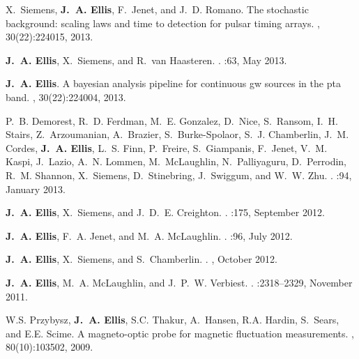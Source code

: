 \documentclass[11pt,letterpaper,sans]{moderncv} %
\begin{document}
\begin{thebibliography}{10}
X.~{Siemens}, \textbf{J.~A. {Ellis}}, F.~{Jenet}, and J.~D. {Romano}.
\newblock The stochastic background: scaling laws and time to detection for
  pulsar timing arrays.
, 30(22):224015, 2013.

\textbf{J.~A. {Ellis}}, X.~{Siemens}, and R.~{van Haasteren}.
.
:63, May 2013.

\textbf{J.~A. {Ellis}}.
\newblock A bayesian analysis pipeline for continuous gw sources in the pta
  band.
, 30(22):224004, 2013.

P.~B. {Demorest}, R.~D. {Ferdman}, M.~E. {Gonzalez}, D.~{Nice}, S.~{Ransom},
  I.~H. {Stairs}, Z.~{Arzoumanian}, A.~{Brazier}, S.~{Burke-Spolaor}, S.~J.
  {Chamberlin}, J.~M. {Cordes}, \textbf{J.~A. {Ellis}}, L.~S. {Finn}, P.~{Freire},
  S.~{Giampanis}, F.~{Jenet}, V.~M. {Kaspi}, J.~{Lazio}, A.~N. {Lommen},
  M.~{McLaughlin}, N.~{Palliyaguru}, D.~{Perrodin}, R.~M. {Shannon},
  X.~{Siemens}, D.~{Stinebring}, J.~{Swiggum}, and W.~W. {Zhu}.
.
:94, January 2013.

\textbf{J.~A. {Ellis}}, X.~{Siemens}, and J.~D.~E. {Creighton}.
.
:175, September 2012.

\textbf{J.~A. {Ellis}}, F.~A. {Jenet}, and M.~A. {McLaughlin}.
.
:96, July 2012.

\textbf{J.~A. {Ellis}}, X.~{Siemens}, and S.~{Chamberlin}.
.
, October 2012.

\textbf{J.~A. {Ellis}}, M.~A. {McLaughlin}, and J.~P.~W. {Verbiest}.
.
:2318--2329, November 2011.

W.S. Przybysz, \textbf{J.~A. {Ellis}}, S.C. Thakur, A.~Hansen, R.A. Hardin, S.~Sears, and
  E.E. Scime.
\newblock A magneto-optic probe for magnetic fluctuation measurements.
, 80(10):103502, 2009.

\end{thebibliography}
\end{document}
